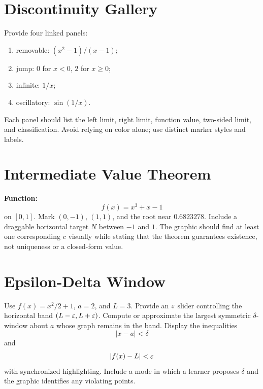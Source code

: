 \section{Discontinuity Gallery}

\begin{bggraphspec}
Provide four linked panels:
\begin{enumerate}
  \item removable: \((x^2-1)/(x-1)\);
  \item jump: \(0\) for \(x<0\), \(2\) for \(x\ge0\);
  \item infinite: \(1/x\);
  \item oscillatory: \(\sin(1/x)\).
\end{enumerate}
Each panel should list the left limit, right limit, function value, two-sided limit, and classification. Avoid relying on color alone; use distinct marker styles and labels.
\end{bggraphspec}

\section{Intermediate Value Theorem}

\begin{bggraphspec}
\textbf{Function:}
\[
  f(x)=x^3+x-1
\]
on \([0,1]\). Mark \((0,-1)\), \((1,1)\), and the root near \(0.6823278\). Include a draggable horizontal target \(N\) between \(-1\) and \(1\). The graphic should find at least one corresponding \(c\) visually while stating that the theorem guarantees existence, not uniqueness or a closed-form value.
\end{bggraphspec}

\section{Epsilon-Delta Window}

\begin{bggraphspec}
Use \(f(x)=x^2/2+1\), \(a=2\), and \(L=3\). Provide an \(\varepsilon\) slider controlling the horizontal band \((L-\varepsilon,L+\varepsilon)\). Compute or approximate the largest symmetric \(\delta\)-window about \(a\) whose graph remains in the band. Display the inequalities
\[
  |x-a|<\delta
\]
and
\[
  |f(x)-L|<\varepsilon
\]
with synchronized highlighting. Include a mode in which a learner proposes \(\delta\) and the graphic identifies any violating points.
\end{bggraphspec}

